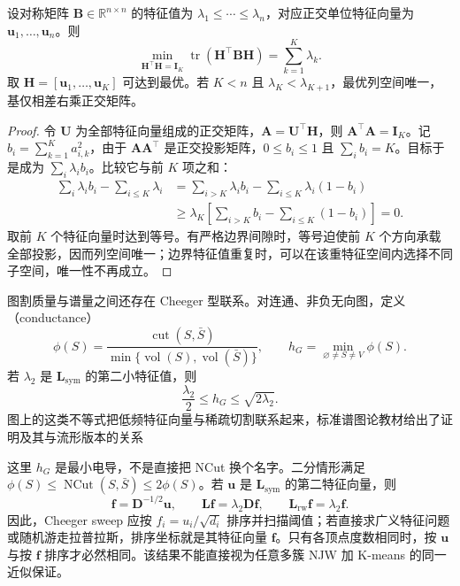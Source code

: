 \begin{theorem}
 \label{thm:clustering-rayleigh}
 设对称矩阵 $\bm{B}\in\mathbb{R}^{n\times n}$ 的特征值为 $\lambda_1\leq\cdots\leq\lambda_n$，对应正交单位特征向量为 $\bm{u}_1,\ldots,\bm{u}_n$。则
 \[
 \min_{\bm{H}^{\top}\bm{H}=\bm{I}_K}
 \operatorname{tr}(\bm{H}^{\top}\bm{B}\bm{H})
 =\sum_{k=1}^K\lambda_k.
 \]
 取 $\bm{H}=[\bm{u}_1,\ldots,\bm{u}_K]$ 可达到最优。若 $K<n$ 且 $\lambda_K<\lambda_{K+1}$，最优列空间唯一，基仅相差右乘正交矩阵。
\end{theorem}
\begin{proof}
令 $\bm{U}$ 为全部特征向量组成的正交矩阵，$\bm{A}=\bm{U}^{\top}\bm{H}$，则 $\bm{A}^{\top}\bm{A}=\bm{I}_K$。记 $b_i=\sum_{k=1}^Ka_{i,k}^2$，由于 $\bm{A}\bm{A}^{\top}$ 是正交投影矩阵，$0\leq b_i\leq1$ 且 $\sum_i b_i=K$。目标于是成为 $\sum_i\lambda_i b_i$。比较它与前 $K$ 项之和：
\[
 \begin{aligned}
 \sum_i\lambda_i b_i-\sum_{i\leq K}\lambda_i
 &=
 \sum_{i>K}\lambda_i b_i
 -\sum_{i\leq K}\lambda_i(1-b_i)\\
 &\geq
 \lambda_K\left[
 \sum_{i>K}b_i-\sum_{i\leq K}(1-b_i)\right]=0.
 \end{aligned}
\]
取前 $K$ 个特征向量时达到等号。有严格边界间隙时，等号迫使前 $K$ 个方向承载全部投影，因而列空间唯一；边界特征值重复时，可以在该重特征空间内选择不同子空间，唯一性不再成立。
\end{proof}

图割质量与谱量之间还存在 Cheeger 型联系。对连通、非负无向图，定义（conductance）
\[
 \phi(S)=
 \frac{\operatorname{cut}(S,\bar S)}
 {\min\{\operatorname{vol}(S),\operatorname{vol}(\bar S)\}},
 \qquad h_G=\min_{\varnothing\ne S\ne V}\phi(S).
\]
若 $\lambda_2$ 是 $\bm{L}_{\mathrm{sym}}$ 的第二小特征值，则
\begin{equation}
 \frac{\lambda_2}{2}\leq h_G\leq\sqrt{2\lambda_2}.
 \label{eq:clustering-cheeger}
\end{equation}
图上的这类不等式把低频特征向量与稀疏切割联系起来，标准谱图论教材给出了证明及其与流形版本的关系

这里 $h_G$ 是最小电导，不是直接把 NCut 换个名字。二分情形满足 $\phi(S)\leq\operatorname{NCut}(S,\bar S)\leq2\phi(S)$。若 $\bm{u}$ 是 $\bm{L}_{\mathrm{sym}}$ 的第二特征向量，则
\[
 \bm{f}=\bm{D}^{-1/2}\bm{u},
 \qquad
 \bm{L}\bm{f}=\lambda_2\bm{D}\bm{f},
 \qquad
 \bm{L}_{\mathrm{rw}}\bm{f}=\lambda_2\bm{f}.
\]
因此，Cheeger sweep 应按 $f_i=u_i/\sqrt{d_i}$ 排序并扫描阈值；若直接求广义特征问题或随机游走拉普拉斯，排序坐标就是其特征向量 $\bm{f}$。只有各顶点度数相同时，按 $\bm{u}$ 与按 $\bm{f}$ 排序才必然相同。该结果不能直接视为任意多簇 NJW 加 K-means 的同一近似保证。

